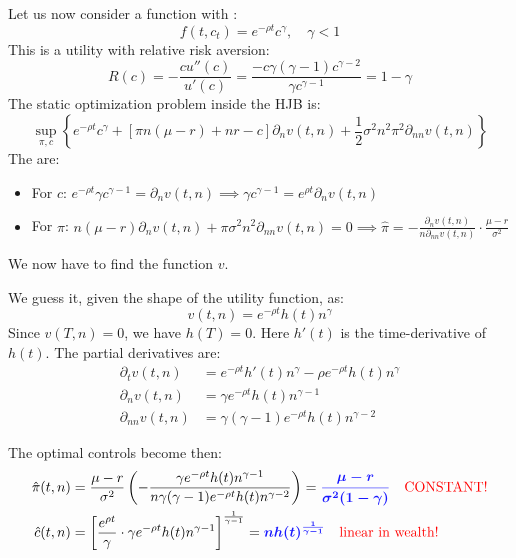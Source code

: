 Let us now consider a  function with :
\begin{equation*}
    f(t, c_t) = e^{-\rho t} c^\gamma, \quad \gamma < 1
\end{equation*}
This is a  utility with relative risk aversion:
\begin{equation*}
    R(c) = - \frac{c u''(c)}{u'(c)} = \frac{-c \gamma (\gamma - 1) c^{\gamma-2}}{\gamma c^{\gamma-1}} = 1 - \gamma
\end{equation*}
The static optimization problem inside the HJB is:
\begin{equation*}
    \sup_{\pi, c} \left\{ e^{-\rho t} c^\gamma + [\pi n (\mu - r) + nr - c] \partial_n v(t,n) + \frac{1}{2} \sigma^2 n^2 \pi^2 \partial_{nn} v(t,n) \right\}
\end{equation*}
The  are:
\begin{itemize}
    \item[(a)] For $c$: $e^{-\rho t} \gamma c^{\gamma-1} = \partial_n v(t,n) \implies \gamma c^{\gamma-1} = e^{\rho t} \partial_n v(t,n)$
    \item[(b)] For $\pi$: $n(\mu - r) \partial_n v(t,n) + \pi \sigma^2 n^2 \partial_{nn} v(t,n) = 0 \implies \hat{\pi} = - \frac{\partial_n v(t,n)}{n \partial_{nn} v(t,n)} \cdot \frac{\mu - r}{\sigma^2}$
\end{itemize}


We now have to find the function $v$.

We guess it, given the shape of the utility function, as:
\begin{equation*}
    v(t,n) = e^{-\rho t} h(t) n^\gamma
\end{equation*}
Since $v(T,n) = 0$, we have $h(T) = 0$. Here $h'(t)$ is the time-derivative of $h(t)$.
The partial derivatives are:
\begin{align*}
    \partial_t v(t,n) &= e^{-\rho t} h'(t) n^\gamma - \rho e^{-\rho t} h(t) n^\gamma \\
    \partial_n v(t,n) &= \gamma e^{-\rho t} h(t) n^{\gamma-1} \\
    \partial_{nn} v(t,n) &= \gamma(\gamma-1) e^{-\rho t} h(t) n^{\gamma-2}
\end{align*}

The optimal controls become then:
\begin{align*}
    \hat{\pi}(t,n) &= \frac{\mu-r}{\sigma^2} \left( -\frac{\gamma e^{-\rho t} h(t) n^{\gamma-1}}{n \gamma(\gamma-1) e^{-\rho t} h(t) n^{\gamma-2}} \right) = \vocab{$\frac{\mu-r}{\sigma^2(1-\gamma)}$} \quad \text{\color{red}CONSTANT!} \\
    \hat{c}(t,n) &= \left[ \frac{e^{\rho t}}{\gamma} \cdot \gamma e^{-\rho t} h(t) n^{\gamma-1} \right]^{\frac{1}{\gamma-1}} = \vocab{$n h(t)^{\frac{1}{\gamma-1}}$} \quad \text{\color{red}linear in wealth!}
\end{align*}

